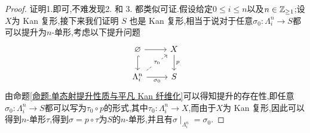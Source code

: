 \begin{proof}
    证明1.即可,不难发现2. 和 3. 都类似可证.假设给定$0\leq i \leq n$以及$n \in \mathbb{Z}_{\geq 1}$;设$X$为 Kan 复形,接下来我们证明 $S$ 也是 Kan 复形,相当于说对于任意$\sigma_0:\Lambda_i^n \to S$都可以提升为$n$-单形,考虑以下提升问题
    \[\begin{tikzcd}
	\varnothing & X \\
	{\Lambda_i^n} & S
	\arrow[from=1-1, to=1-2]
	\arrow[hook, from=1-1, to=2-1]
	\arrow["p", from=1-2, to=2-2]
	\arrow["{\tau_0}"{description}, dashed, from=2-1, to=1-2]
	\arrow["{\sigma_0}"', from=2-1, to=2-2]
    \end{tikzcd}\]
    由命题\ref{命题:单态射提升性质与平凡 Kan 纤维化}可以得知提升的存在性,即任意$\sigma_0 : \Lambda_i^n \to S$都可以写为$\tau_0 \circ p$的形式,其中$\tau_0 : \Lambda_i^n \to X$,而由于$X$为 Kan 复形,因此可以得到$n$-单形$\tau$,得到$\sigma = p\circ\tau$为$S$的$n$-单形,并且有$\sigma\mid_{\Lambda_i^n}=\sigma_0$.
\end{proof}
